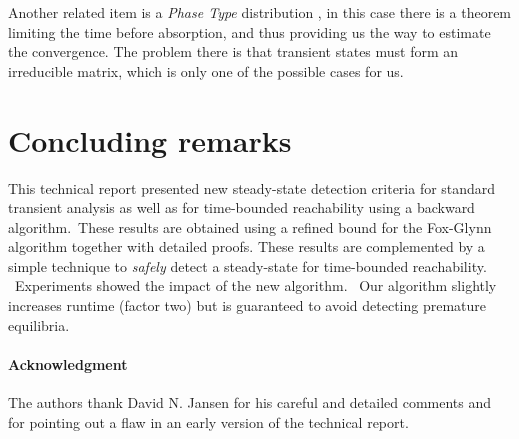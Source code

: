 \documentclass[a4paper,11pt]{article}
\newcommand{\Section}[1]{\section{#1}}
\begin{document}
		Another related item is a \emph{Phase Type} distribution \cite{Neuts_81}, in this case there is a theorem limiting the time before absorption, and thus providing us the way to estimate the convergence. The problem there is that transient states must form an irreducible matrix, which is only one of the possible cases for us.

\Section{Concluding remarks \label{s:concl}}
	This technical report presented new steady-state detection criteria for standard transient analysis as well as for time-bounded reachability using a backward algorithm. These results are obtained using a refined bound for the Fox-Glynn algorithm together with detailed proofs. These results are complemented by a simple technique to \emph{safely} detect a steady-state for time-bounded reachability.  Experiments showed the impact of the new algorithm.  Our algorithm slightly increases runtime (factor two) but is guaranteed to avoid detecting premature equilibria.
	
	\paragraph{Acknowledgment}
	The authors thank David N. Jansen for his careful and detailed comments and for pointing out a flaw in an early version of the technical report.

{\footnotesize
	
}
\end{document}
